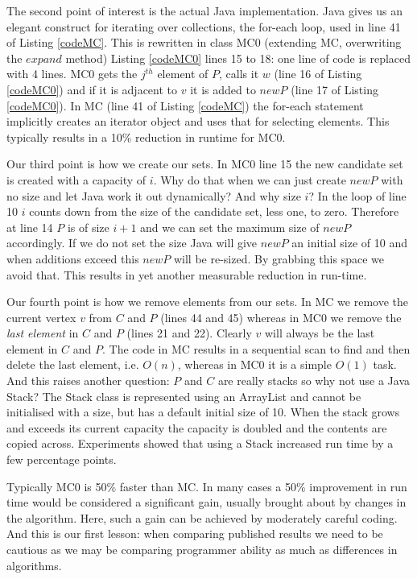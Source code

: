 \documentclass{l4proj}
\begin{document}
The second point of interest is the actual Java implementation. Java gives us
an elegant construct for iterating over collections, the for-each loop, used in line 41 of Listing \ref{codeMC}. This is
rewritten in class MC0 (extending MC, overwriting the $expand$ method) Listing \ref{codeMC0} lines 15 to 18: 
one line of code is replaced with 4 lines. MC0 gets the
$j^{th}$ element of $P$, calls it $w$ (line 16 of Listing \ref{codeMC0}) and if it is adjacent to $v$ it is added to
$newP$ (line 17 of Listing \ref{codeMC0}). In MC (line 41 of Listing \ref{codeMC}) the for-each statement implicitly creates an
iterator object and uses that for selecting elements. This typically results in a 10\% reduction in runtime for MC0.

Our third point is how we create our sets. In MC0 line 15 the new candidate set is created with a capacity of $i$. 
Why do that when we can just create 
$newP$ with no size and let Java work it out dynamically? And why size $i$? In the loop of line 10 $i$ counts down from the
size of the candidate set, less one, to zero. Therefore at line 14 $P$ is of size $i+1$ and we can
set the maximum size of $newP$ accordingly. If we do not set the
size Java will give $newP$ an initial size of 10 and when additions exceed this $newP$ will be re-sized. By grabbing this space
we avoid that. This results in yet another measurable reduction in run-time.  

Our fourth point is how we remove elements from our sets. In MC we remove the current vertex $v$ from $C$ and $P$ 
(lines 44 and 45) whereas in MC0 we remove the \emph{last element} in $C$ and $P$ (lines 21 and 22). Clearly $v$ will always
be the last element in $C$ and $P$. The code in MC results in a sequential scan to find and then delete the last
element, i.e. $O(n)$, whereas in MC0 it is a simple $O(1)$ task. And this raises another question: $P$ and $C$ are really stacks
so why not use a Java Stack? The Stack class is represented using an ArrayList and cannot be initialised with a size,
but has a default initial size of 10. When the stack grows and exceeds its current capacity the capacity is doubled
and the contents are copied across. Experiments showed that using a Stack increased run time by a few percentage points.

Typically MC0 is 50\% faster than MC. In many cases a 50\% improvement in run time would be considered 
a significant gain, usually brought about by changes in the algorithm. Here, such a gain can be achieved by
moderately careful coding. And this is our first lesson: when comparing published results we need to be cautious
as we may be comparing programmer ability as much as differences in algorithms.
\end{document}
